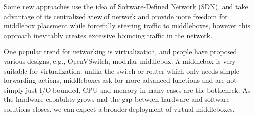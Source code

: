 \documentclass[twocolumn]{article}
\begin{document}
Some new approaches use the idea of Software-Defined Network (SDN), and take advantage of its centralized view of network and provide more freedom for middlebox placement while forcefully steering traffic to middleboxes, however this approach inevitably creates excessive bouncing traffic in the network\cite{SIMPLE2013,FLOWTAGS2014}.

One popular trend for networking is virtualization, and people have proposed various designs, e.g., OpenVSwitch\cite{openvswitch}, modular middlebox\cite{COMB2012, clickos}. A middlebox is very suitable for virtualization: unlike the switch or router which only needs simple forwarding actions, middleboxes ask for more advanced functions and are not simply just I/O bounded, CPU and memory in many cases are the bottleneck. As the hardware capability grows and the gap between hardware and software solutions closes, we can expect a broader deployment of virtual middleboxes. 
\end{document}
